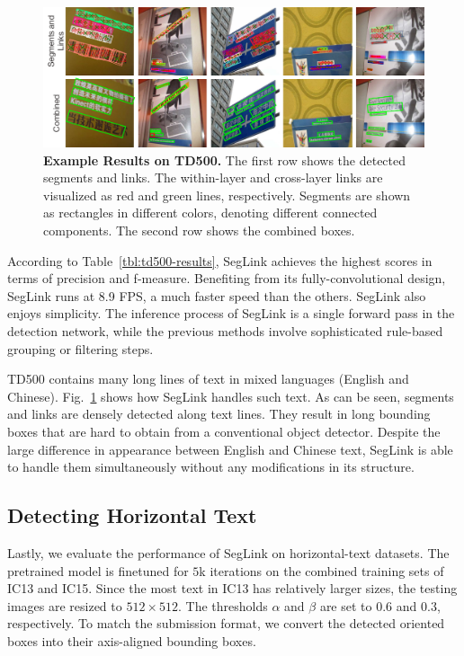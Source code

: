 \documentclass[10pt,twocolumn,letterpaper]{article}
\begin{document}
\begin{figure}[t]
  \centering
  \includegraphics[width=0.85\linewidth]{figures/td500-examples-new-compressed.pdf}
  \caption{\textbf{Example Results on TD500.} The first row shows the detected segments and links. The within-layer and cross-layer links are visualized as red and green lines, respectively. Segments are shown as rectangles in different colors, denoting different connected components. The second row shows the combined boxes.}
  \label{fig:td500-examples}
\end{figure}

According to Table~\ref{tbl:td500-results}, SegLink achieves the highest scores in terms of precision and f-measure.
Benefiting from its fully-convolutional design, SegLink runs at 8.9 FPS, a much faster speed than the others.
SegLink also enjoys simplicity.
The inference process of SegLink is a single forward pass in the detection network,
while the previous methods \cite{cvpr/YaoBLMT12, pami/YinYHH14, cvpr/ZhangZSYLB16} involve sophisticated rule-based grouping or filtering steps.

TD500 contains many long lines of text in mixed languages (English and Chinese).
Fig.~\ref{fig:td500-examples} shows how SegLink handles such text.
As can be seen, segments and links are densely detected along text lines.
They result in long bounding boxes that are hard to obtain from a conventional object detector.
Despite the large difference in appearance between English and Chinese text, SegLink is able to handle them simultaneously without any modifications in its structure.

\subsection{Detecting Horizontal Text}
Lastly, we evaluate the performance of SegLink on horizontal-text datasets.
The pretrained model is finetuned for $5$k iterations on the combined training sets of IC13 and IC15.
Since the most text in IC13 has relatively larger sizes, the testing images are resized to $512 \times 512$.
The thresholds $\alpha$ and $\beta$ are set to $0.6$ and $0.3$, respectively.
To match the submission format, we convert the detected oriented boxes into their axis-aligned bounding boxes.
\end{document}

